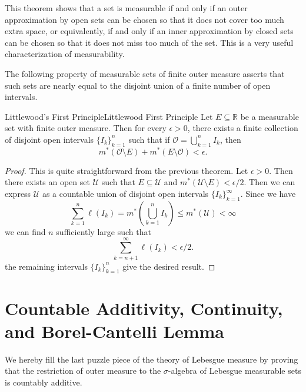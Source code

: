\documentclass[../main.tex]{subfiles}
\begin{document}
\begin{remark}
  This theorem shows that a set is measurable if and only if an outer approximation by open sets can be chosen so that it does not cover too much extra space, or equivalently, if and only if an inner approximation by closed sets can be chosen so that it does not miss too much of the set. This is a very useful characterization of measurability.
\end{remark}

The following property of measurable sets of finite outer measure asserts that such sets are nearly equal to the disjoint union of a finite number of open intervals.

\begin{theorem}{Littlewood's First Principle}{Littlewood First Principle}
  Let $E \subseteq \mathbb{R}$ be a measurable set with finite outer measure. Then for every $\epsilon > 0$, there exists a finite collection of disjoint open intervals $\{I_k\}_{k=1}^{n}$ such that if $\mathcal{O} = \bigcup_{k=1}^{n} I_k$, then 
  \begin{equation}
    m^*(\mathcal{O} \setminus E) + m^*(E \setminus \mathcal{O}) < \epsilon.
  \end{equation}
\end{theorem}
\begin{proof}
  This is quite straightforward from the previous theorem. Let $\epsilon > 0$. Then there exists an open set $\mathcal{U}$ such that $E \subseteq \mathcal{U}$ and $m^*(\mathcal{U} \setminus E) < \epsilon/2$. Then we can express $\mathcal{U}$ as a countable union of disjoint open intervals $\{I_k\}_{k=1}^{\infty}$. Since we have
  \begin{equation*}
    \sum_{k=1}^{n} \ell(I_k) = m^*\left(\bigcup_{k=1}^{n} I_k\right) \leq m^*(\mathcal{U}) < \infty
  \end{equation*}
  we can find $n$ sufficiently large such that
  \begin{equation*}
    \sum_{k=n+1}^{\infty} \ell(I_k) < \epsilon/2.
  \end{equation*}
  the remaining intervals $\{I_k\}_{k=1}^{n}$ give the desired result.
\end{proof}

\section{Countable Additivity, Continuity, and Borel-Cantelli Lemma}

We hereby fill the last puzzle piece of the theory of Lebesgue measure by proving that the restriction of outer measure to the $\sigma$-algebra of Lebesgue measurable sets is countably additive.
\end{document}
